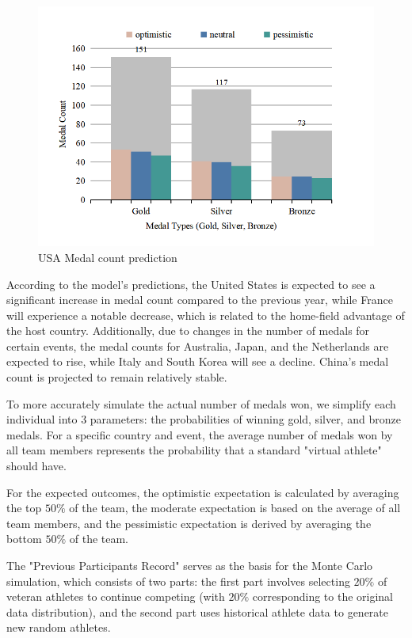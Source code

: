 \documentclass[12pt]{article}  %
\begin{document}
\begin{figure}[htbp]
	\centering
	\includegraphics[width=12cm]{img/OP1.png}
	\caption{USA Medal count prediction}
	\label{fig:USA}
\end{figure}


According to the model's predictions, the United States is expected to see a significant increase in medal count compared to the previous year, while France will experience a notable decrease, which is related to the home-field advantage of the host country. Additionally, due to changes in the number of medals for certain events, the medal counts for Australia, Japan, and the Netherlands are expected to rise, while Italy and South Korea will see a decline. China's medal count is projected to remain relatively stable.

To more accurately simulate the actual number of medals won, we simplify each individual into 3 parameters: the probabilities of winning gold, silver, and bronze medals. For a specific country and event, the average number of medals won by all team members represents the probability that a standard "virtual athlete" should have.

For the expected outcomes, the optimistic expectation is calculated by averaging the top \( 50\% \) of the team, the moderate expectation is based on the average of all team members, and the pessimistic expectation is derived by averaging the bottom \( 50\% \) of the team.

The "Previous Participants Record" serves as the basis for the Monte Carlo simulation, which consists of two parts: the first part involves selecting \( 20\% \) of veteran athletes to continue competing (with \( 20\% \) corresponding to the original data distribution), and the second part uses historical athlete data to generate new random athletes.
\end{document}
